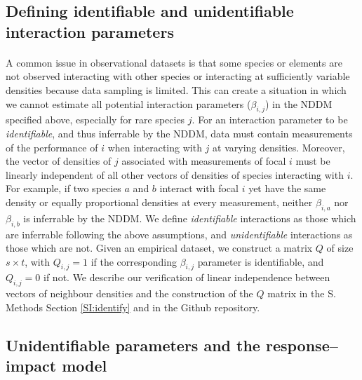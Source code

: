 \documentclass[a4,12pt]{article}
\begin{document}
\begin{refsection}
    \subsection{Defining identifiable and unidentifiable interaction parameters}
    \label{meth:id_params}

    \paragraph{}
    A common issue in observational datasets is that some species or elements are not observed interacting with other species or interacting at sufficiently variable densities because data sampling is limited. This can create a situation in which we cannot estimate all potential interaction parameters ($\beta_{i,j}$) in the NDDM specified above, especially for rare species $j$. For an interaction parameter to be \textit{identifiable}, and thus inferrable by the NDDM, data must contain measurements of the performance of $i$ when interacting with $j$ at varying densities. Moreover, the vector of densities of $j$ associated with measurements of focal $i$ must be linearly independent of all other vectors of densities of species interacting with $i$. For example, if two species $a$ and $b$ interact with focal $i$ yet have the same density or equally proportional densities at every measurement, neither $\beta_{i, a}$ nor $\beta_{i, b}$ is inferrable by the NDDM. We define \textit{identifiable} interactions as those which are inferrable following the above assumptions, and \textit{unidentifiable} interactions as those which are not. Given an empirical dataset, we construct a matrix $Q$ of size $s \times t$, with $Q_{i, j} = 1$ if the corresponding $\beta_{i, j}$ parameter is identifiable, and $Q_{i, j} = 0$ if not. We describe our verification of linear independence between vectors of neighbour densities and the construction of the $Q$ matrix in the S. Methods Section \ref{SI:identify} and in the Github repository.
    
    \subsection{Unidentifiable parameters and the response--impact model}
    \label{meth:rim}


\end{refsection}
\end{document}
